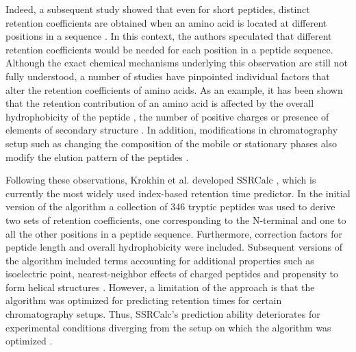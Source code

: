 \documentclass[a4paper]{article}
\begin{document}

\vspace{0.15cm}

Indeed, a subsequent study showed that even for short peptides,
distinct retention coefficients are obtained when an amino acid is
located at different positions in a sequence \cite{Houghten1987}. In
this context, the authors speculated that different retention
coefficients would be needed for each position in a peptide
sequence. Although the exact chemical mechanisms underlying this
observation are still not fully understood, a number of studies have
pinpointed individual factors that alter the retention coefficients of
amino acids. As an example, it has been shown that the retention
contribution of an amino acid is affected by the overall
hydrophobicity of the peptide \cite{Mant2006}, the number of positive
charges \cite{Mant2006} or presence of elements of secondary
structure \cite{Zhou1990}. In addition, modifications in
chromatography setup such as changing the composition of the mobile or
stationary phases also modify the elution pattern of the
peptides \cite{Browne1982, Guo1987, Gilar2010}.

\vspace{0.15cm}
Following these observations, Krokhin et al. developed
SSRCalc \cite{Krokhin2004}, which is currently the most widely used
index-based retention time predictor. In the initial version of the
algorithm a collection of 346 tryptic peptides was used to derive two
sets of retention coefficients, one corresponding to the N-terminal
and one to all the other positions in a peptide sequence. Furthermore,
correction factors for peptide length and overall hydrophobicity were
included. Subsequent versions of the algorithm included terms
accounting for additional properties such as isoelectric point,
nearest-neighbor effects of charged peptides and propensity to form
helical structures \cite{Krokhin2006}. However, a limitation of the
approach is that the algorithm was optimized for predicting retention
times for certain chromatography setups. Thus, SSRCalc's prediction
ability deteriorates for experimental conditions diverging from the
setup on which the algorithm was optimized \cite{Spicer2007}.
\end{document}
